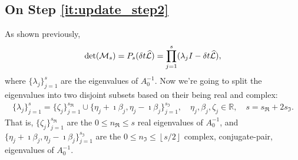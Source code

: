 \documentclass[review]{siamart}
\newcommand{\mdet}{\operatorname{det}}
\begin{document}
\subsection{On Step \ref{it:update_step2}}
As shown previously, 
\begin{align}
\mdet ({\cal M}_s) = P_s(\delta t \widehat{\cal L}) = \prod \limits_{j = 1}^s (\lambda_j I - \delta t \widehat{\cal L}),
\end{align}
where $\{ \lambda_j \}_{j = 1}^s$ are the eigenvalues of $A_0^{-1}$. Now we're going to split the eigenvalues into two disjoint subsets based on their being real and complex:
\begin{align}
\{\lambda_j \}_{j = 1}^s = \{\zeta_j \}_{j = 1}^{s_{\Re}} \cup \{ \eta_j + \imath \beta_j, \eta_j - \imath \beta_j \}_{j = 1}^{s_{\Im}}, 
\quad \eta_j, \beta_j, \zeta_j \in \mathbb{R},
\quad s = s_{\Re} + 2 s_{\Im}.
\end{align}
That is, $\{\zeta_j \}_{j = 1}^{s_{\Re}}$ are the $0 \leq n_{\Re} \leq s$ real eigenvalues of $A_0^{-1}$, and $\{ \eta_{j} + \imath \beta_{j}, \eta_{j} - \imath \beta_{j} \}_{j = 1}^{s_{\Im}}$ are the $0 \leq {n_{\Im}} \leq \left \lfloor{s/2}\right \rfloor $ complex, conjugate-pair, eigenvalues of $A_0^{-1}$. 
\end{document}
